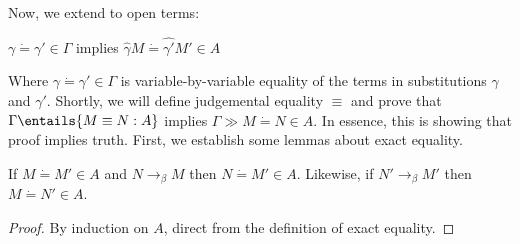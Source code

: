 \documentclass[letterpaper]{article}
\begin{document}
Now, we extend to open terms:


\begin{definition}[$\Gamma \gg M \dot{=} M' \in A$]
    $\gamma \dot{=} \gamma' \in \Gamma$ implies $\hat{\gamma} M \dot{=} \hat{\gamma'} M' \in A$ 
\end{definition}

Where $\gamma \dot{=} \gamma' \in \Gamma$ is variable-by-variable equality of the terms in substitutions $\gamma$ and $\gamma'$. 
Shortly, we will define judgemental equality $\equiv$ and prove that $\Gamma \entails{M \equiv N : A}$ implies $\Gamma \gg M \dot{=} N \in A$.
In essence, this is showing that proof implies truth. First, we establish some lemmas about exact equality.

\begin{lemma}\label{lem:headexpansion}
    If $M \dot{=} M' \in A$ and $N \to_\beta M$ then $N \dot{=} M' \in A$. Likewise, if $N' \to_\beta M'$ then $M \dot{=} N' \in A$. 
\end{lemma}
\begin{proof}
By induction on $A$, direct from the definition of exact equality.
\end{proof}
\end{document}
